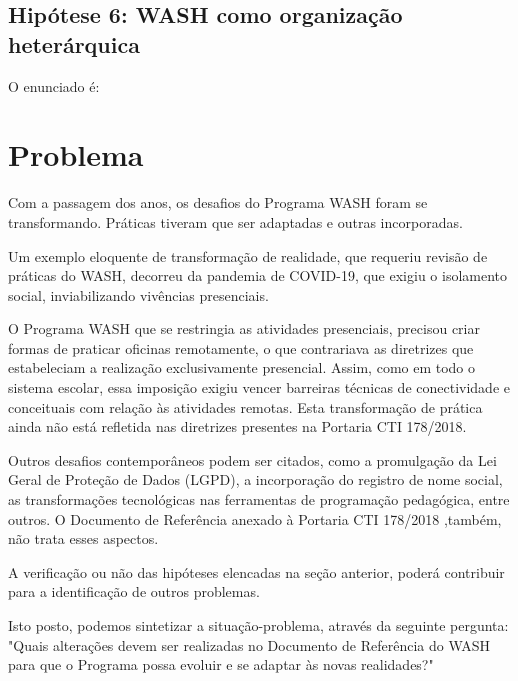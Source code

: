 \subsection[Hipótese 6: WASH como organização heterárquica]{Hipótese 6: WASH como organização heterárquica}\label{Hipótese 6: WASH como organização heterárquica}
O enunciado é:


\noindent\begin{center}\mbox{\centering{}}\end{center}


\section[Problema]{Problema}\label{Problema}
Com a passagem dos anos, os desafios do Programa WASH foram se transformando. Práticas tiveram que ser adaptadas e outras incorporadas.

Um exemplo eloquente de transformação de realidade, que requeriu revisão de práticas do WASH, decorreu da pandemia de COVID-19, que exigiu o isolamento social, inviabilizando vivências presenciais.

O Programa WASH que se restringia as atividades presenciais, precisou criar formas de praticar oficinas remotamente, o que contrariava as diretrizes que estabeleciam a realização exclusivamente presencial. Assim, como em todo o sistema escolar, essa imposição exigiu vencer barreiras técnicas de conectividade e conceituais com relação às atividades remotas. Esta transformação de prática ainda não está refletida nas diretrizes presentes na Portaria CTI 178/2018.

Outros desafios contemporâneos podem ser citados, como a promulgação da Lei Geral de Proteção de Dados (LGPD), a incorporação do registro de nome social, as transformações tecnológicas nas ferramentas de programação pedagógica, entre outros. O Documento de Referência anexado à Portaria CTI 178/2018 ,também, não trata esses aspectos.

A verificação ou não das hipóteses elencadas na seção anterior, poderá contribuir para a identificação de outros problemas.

Isto posto, podemos sintetizar a situação-problema, através da seguinte pergunta: "Quais alterações devem ser realizadas no Documento de Referência do WASH para que o Programa possa evoluir e se adaptar às novas realidades?"

